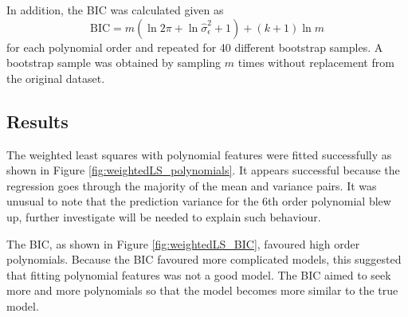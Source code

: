 \documentclass[12pt]{report}
\begin{document}
In addition, the BIC was calculated given as
\begin{equation}
\text{BIC} = m\left(\ln2\pi+\ln\widehat{\sigma}_\epsilon^2+1\right)+(k+1)\ln{m}
\end{equation}
for each polynomial order and repeated for 40 different bootstrap samples. A bootstrap sample was obtained by sampling $m$ times without replacement from the original dataset. 

\subsection{Results}
The weighted least squares with polynomial features were fitted successfully as shown in Figure \ref{fig:weightedLS_polynomials}. It appears successful because the regression goes through the majority of the mean and variance pairs. It was unusual to note that the prediction variance for the 6th order polynomial blew up, further investigate will be needed to explain such behaviour.

The BIC, as shown in Figure \ref{fig:weightedLS_BIC}, favoured high order polynomials. Because the BIC favoured more complicated models, this suggested that fitting polynomial features was not a good model. The BIC aimed to seek more and more polynomials so that the model becomes more similar to the true model. 
\end{document}
